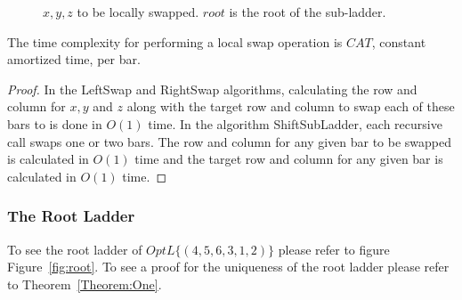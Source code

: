 \begin{figure}[!htp]
\begin{center}
\begin{minipage}{.5\textwidth}
	 \end{minipage}
	 \end{center}
	\caption{$x,y,z$ to be locally swapped. $root$ is the root of the sub-ladder.}
	\label{Fig:SwapAndShift}
\end{figure}

\begin{lemma}[h]
	The time complexity for performing a local swap operation is $CAT$, constant amortized time, per bar. 
\end{lemma}
\begin{proof}
	In the {\sc LeftSwap} and {\sc RightSwap} algorithms, calculating the row and column for $x,y$ and $z$ 
	along with the target row and column to swap each of these bars to is done in $O(1)$ time.
	In the algorithm {\sc ShiftSubLadder}, each recursive call swaps one or two bars. The row and 
	column for any given bar to be swapped is calculated in $O(1)$ time and the target row 
	and column for any given bar is calculated in $O(1)$ time.
\end{proof}





\subsubsection{The Root Ladder}
To see the root ladder of $OptL\{(4,5,6,3,1,2)\}$ please refer to figure Figure~\ref{fig:root}. To see a proof 
for the uniqueness of the root ladder please refer to Theorem~\ref{Theorem:One}.

